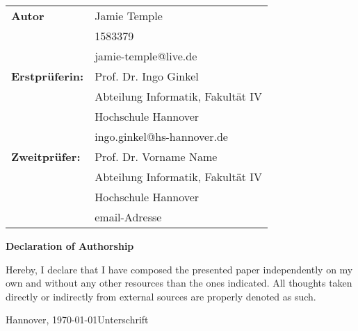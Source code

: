 \thispagestyle{empty}
\begin{tabular}{ll}
  {\bfseries\sffamily Autor}         & Jamie Temple                      \\
                                     & 1583379                           \\
                                     & jamie-temple@live.de              \\[5ex]
  {\bfseries\sffamily Erstprüferin:} & Prof. Dr. Ingo Ginkel             \\
                                     & Abteilung Informatik, Fakultät IV \\
                                     & Hochschule Hannover               \\
                                     & ingo.ginkel@hs-hannover.de        \\[5ex]
  {\bfseries\sffamily Zweitprüfer:}  & Prof. Dr. Vorname Name            \\
                                     & Abteilung Informatik, Fakultät IV \\
                                     & Hochschule Hannover               \\
                                     & email-Adresse
\end{tabular}

\vfill

\begin{center} \sffamily\bfseries Declaration of Authorship \end{center}

Hereby, I declare that I have composed the presented paper independently on 
my own and without any other resources than the ones indicated. All thoughts
taken directly or indirectly from external sources are properly denoted as such.
\vspace*{7ex}

Hannover, \today \hfill Unterschrift
\newpage